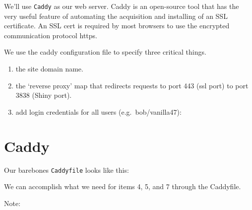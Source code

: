 \documentclass[
  letterpaper,
  DIV=11,
  numbers=noendperiod,
  oneside]{scrartcl}
\newenvironment{Shaded}{\begin{snugshade}}{\end{snugshade}}
\newcommand{\CommentTok}[1]{\textcolor[rgb]{0.37,0.37,0.37}{#1}}
\newcommand{\DecValTok}[1]{\textcolor[rgb]{0.68,0.00,0.00}{#1}}
\newcommand{\ErrorTok}[1]{\textcolor[rgb]{0.68,0.00,0.00}{#1}}
\newcommand{\NormalTok}[1]{\textcolor[rgb]{0.00,0.23,0.31}{#1}}
\newcommand{\SpecialCharTok}[1]{\textcolor[rgb]{0.37,0.37,0.37}{#1}}
\providecommand{\tightlist}{%
  \setlength{\itemsep}{0pt}\setlength{\parskip}{0pt}}\usepackage{longtable,booktabs,array}
\begin{document}
We'll use \texttt{Caddy} as our web server. Caddy is an open-source tool
that has the very useful feature of automating the acquisition and
installing of an SSL certificate. An SSL cert is required by most
browsers to use the encrypted communication protocol https.

We use the caddy configuration file to specify three critical things.

\begin{enumerate}
\def\labelenumi{\arabic{enumi}.}
\tightlist
\item
  the site domain name.
\item
  the `reverse proxy' map that redirects requests to port 443 (ssl port)
  to port 3838 (Shiny port).
\item
  add login credentials for all users (e.g.~bob/vanilla47):
\end{enumerate}

\hypertarget{caddy}{%
\section{Caddy}\label{caddy}}

Our barebones \texttt{Caddyfile} looks like this:

\begin{Shaded}
\end{Shaded}

We can accomplish what we need for items 4, 5, and 7 through the
Caddyfile.

Note:
\end{document}
